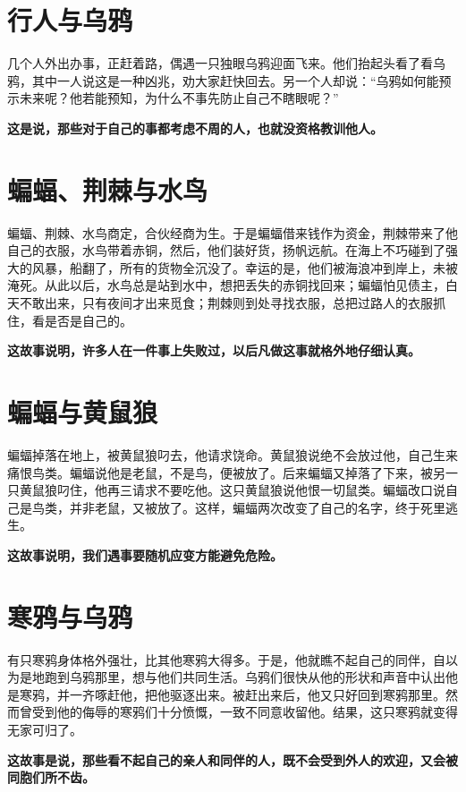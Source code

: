 \section{行人与乌鸦}

几个人外出办事，正赶着路，偶遇一只独眼乌鸦迎面飞来。他们抬起头看了看乌鸦，其中一人说这是一种凶兆，劝大家赶快回去。另一个人却说：“乌鸦如何能预示未来呢？他若能预知，为什么不事先防止自己不瞎眼呢？”

{\bfseries \color{red}这是说，那些对于自己的事都考虑不周的人，也就没资格教训他人。}

\section{蝙蝠、荆棘与水鸟}

蝙蝠、荆棘、水鸟商定，合伙经商为生。于是蝙蝠借来钱作为资金，荆棘带来了他自己的衣服，水鸟带着赤铜，然后，他们装好货，扬帆远航。在海上不巧碰到了强大的风暴，船翻了，所有的货物全沉没了。幸运的是，他们被海浪冲到岸上，未被淹死。从此以后，水鸟总是站到水中，想把丢失的赤铜找回来；蝙蝠怕见债主，白天不敢出来，只有夜间才出来觅食；荆棘则到处寻找衣服，总把过路人的衣服抓住，看是否是自己的。

{\bfseries \color{red}这故事说明，许多人在一件事上失败过，以后凡做这事就格外地仔细认真。}

\section{蝙蝠与黄鼠狼}

蝙蝠掉落在地上，被黄鼠狼叼去，他请求饶命。黄鼠狼说绝不会放过他，自己生来痛恨鸟类。蝙蝠说他是老鼠，不是鸟，便被放了。后来蝙蝠又掉落了下来，被另一只黄鼠狼叼住，他再三请求不要吃他。这只黄鼠狼说他恨一切鼠类。蝙蝠改口说自己是鸟类，并非老鼠，又被放了。这样，蝙蝠两次改变了自己的名字，终于死里逃生。

{\bfseries \color{red}这故事说明，我们遇事要随机应变方能避免危险。}

\section{寒鸦与乌鸦}

有只寒鸦身体格外强壮，比其他寒鸦大得多。于是，他就瞧不起自己的同伴，自以为是地跑到乌鸦那里，想与他们共同生活。乌鸦们很快从他的形状和声音中认出他是寒鸦，并一齐啄赶他，把他驱逐出来。被赶出来后，他又只好回到寒鸦那里。然而曾受到他的侮辱的寒鸦们十分愤慨，一致不同意收留他。结果，这只寒鸦就变得无家可归了。

{\bfseries \color{red}这故事是说，那些看不起自己的亲人和同伴的人，既不会受到外人的欢迎，又会被同胞们所不齿。}

